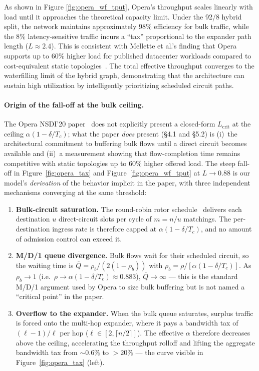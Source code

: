 \documentclass{article}
\begin{document}
    As shown in Figure \ref{fig:opera_wf_tput}, Opera's throughput scales linearly with load until it approaches the theoretical capacity limit. Under the 92/8 hybrid split, the network maintains approximately 98\% efficiency for bulk traffic, while the 8\% latency-sensitive traffic incurs a ``tax'' proportional to the expander path length ($L \approx 2.4$). This is consistent with Mellette et al.'s finding that Opera supports up to $60\%$ higher load for published datacenter workloads compared to cost-equivalent static topologies~\cite{opera}. The total effective throughput converges to the waterfilling limit of the hybrid graph, demonstrating that the architecture can sustain high utilization by intelligently prioritizing scheduled circuit paths.

    \paragraph{Origin of the fall-off at the bulk ceiling.}
    The Opera NSDI'20 paper~\cite{opera} does not explicitly present a closed-form $L_{\text{crit}}$ at the ceiling $\alpha(1-\delta/T_c)$; what the paper \emph{does} present (\S4.1 and \S5.2) is (i)~the architectural commitment to buffering bulk flows until a direct circuit becomes available and (ii)~a measurement showing that flow-completion time remains competitive with static topologies up to 60\% higher offered load.  The steep fall-off in Figure~\ref{fig:opera_tax} and Figure~\ref{fig:opera_wf_tput} at $L \to 0.88$ is our model's \emph{derivation} of the behavior implicit in the paper, with three independent mechanisms converging at the same threshold:
    \begin{enumerate}
        \item \textbf{Bulk-circuit saturation.}  The round-robin rotor schedule~\cite{opera} delivers each destination $u$ direct-circuit slots per cycle of $m = n/u$ matchings.  The per-destination ingress rate is therefore capped at $\alpha(1-\delta/T_c)$, and no amount of admission control can exceed it.
        \item \textbf{M/D/1 queue divergence.}  Bulk flows wait for their scheduled circuit, so the waiting time is $\bar{Q} = \rho_b/(2(1-\rho_b))$ with $\rho_b = \rho/[\alpha(1-\delta/T_c)]$.  As $\rho_b \to 1$ (i.e.\ $\rho \to \alpha(1-\delta/T_c) \approx 0.883$), $\bar{Q} \to \infty$ --- this is the standard M/D/1 argument used by Opera to size bulk buffering but is not named a ``critical point'' in the paper.
        \item \textbf{Overflow to the expander.}  When the bulk queue saturates, surplus traffic is forced onto the multi-hop expander, where it pays a bandwidth tax of $(\ell-1)/\ell$ per hop ($\ell \in [2, \lceil n/2\rceil]$).  The effective $\alpha$ therefore decreases above the ceiling, accelerating the throughput rolloff and lifting the aggregate bandwidth tax from ${\sim}0.6\%$ to $>20\%$ --- the curve visible in Figure~\ref{fig:opera_tax} (left).
    \end{enumerate}
\end{document}

